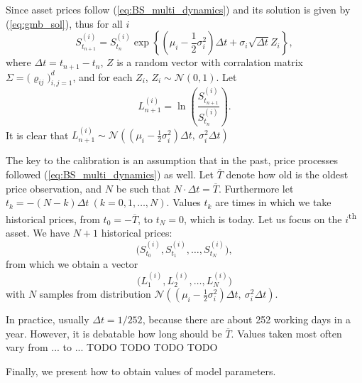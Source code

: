 \documentclass[a4paper,12pt, oneside]{book}
\theoremstyle{definition}
\theoremstyle{remark}
\begin{document}
Since asset prices follow (\ref{eq:BS_multi_dynamics}) and its solution is given by (\ref{eq:gmb_sol}), thus for all $i$
\[  S^{(i)}_{t_{n+1}} = S^{(i)}_{t_n} \exp\left\{ (\mu_i - \frac{1}{2}\sigma_i^2)\Delta t + \sigma_i \sqrt{\Delta t} Z_i \right\}, \]
where $\Delta t = t_{n+1} - t_n$, $Z$ is a random vector with corralation matrix $\Sigma = \bigl( \varrho_{ij} \bigr)_{i,j=1}^d$, and for each $Z_i$, $Z_i \sim \mathcal{N}(0,1)$. Let
\[  L^{(i)}_{n+1} = \ln\left( \frac{S^{(i)}_{t_{n+1}}}{S^{(i)}_{t_n}} \right). \]
It is clear that $ L^{(i)}_{n+1} \sim \mathcal{N}\left(  (\mu_i - \frac{1}{2}\sigma_i^2)\Delta t,\ \sigma_i^2 \Delta t \right)$

The key to the calibration is an assumption that in the past, price processes followed (\ref{eq:BS_multi_dynamics}) as well. Let $\overline{T}$ denote how old is the oldest price observation, and $N$ be such that $N \cdot \Delta t = \overline{T}$. Furthermore let $t_k = -(N-k)\Delta t\ (k=0,1,\ldots,N)$. Values $t_k$ are times in which we take historical prices, from $t_0 = -\overline{T}$, to $t_N = 0$, which is today. Let us focus on the $i$\textsuperscript{th} asset. We have $N+1$ historical prices:
\[  \bigl( S^{(i)}_{t_0}, S^{(i)}_{t_1}, \ldots,S^{(i)}_{t_N} \bigr), \]
from which we obtain a vector
\[ \bigl( L^{(i)}_{1}, L^{(i)}_{2}, \ldots, L^{(i)}_{N} \bigr) \]
with $N$ samples from distribution $\mathcal{N}\left(  (\mu_i - \frac{1}{2}\sigma_i^2)\Delta t,\ \sigma_i^2 \Delta t \right)$.

In practice, usually $\Delta t = 1/252$, because there are about 252 working days in a year. However, it is debatable how long should be $\overline{T}$. Values taken most often vary from ... to ...
{\Large \color{red} TODO TODO TODO TODO }

Finally, we present how to obtain values of model parameters.
\end{document}
